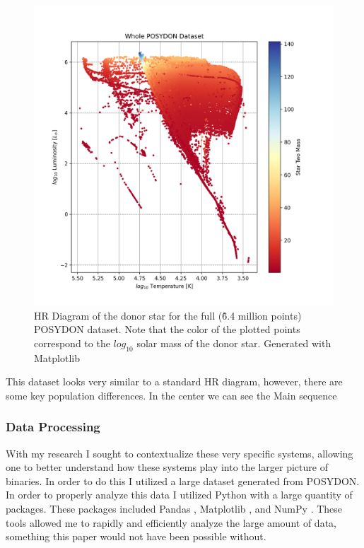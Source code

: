 \documentclass[12pt, a4paper]{article}
\begin{document}
        \begin{figure} [H]
            \centering
            \includegraphics[width = \textwidth]{figs/GeneratedFigs/WholePOSYDONDatasetExample.png}
            \caption{HR Diagram of the donor star for the full (\~6.4 million points) POSYDON dataset. Note that the color of the plotted points correspond to the $log_{10}$ solar mass of the donor star. Generated with Matplotlib}
            \label{EntireDataSetHR}
        \end{figure}

        This dataset looks very similar to a standard HR diagram, however, there are some key population differences. In the center we can see the Main sequence
        \subsubsection{Data Processing}
            With my research I sought to contextualize these very specific systems, allowing one to better understand how these systems play into the larger picture of binaries. In order to do this I utilized a large dataset generated from POSYDON. In order to properly analyze this data I utilized Python with a large quantity of packages. These packages included Pandas \cite{reback2020pandas}, Matplotlib \cite{Matplotlib}, and NumPy \cite{harris2020array}. These tools allowed me to rapidly and efficiently analyze the large amount of data, something this paper would not have been possible without.
\end{document}
